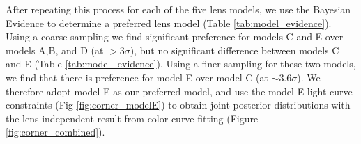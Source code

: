 \documentclass[12pt,dvipsnames]{article}
\def\SNABC{SN Requiem\xspace}
\begin{document}
After repeating this process for each of the five lens models, we use the Bayesian Evidence to determine a preferred lens model (Table \ref{tab:model_evidence}). Using a coarse sampling we find significant preference for models C and E over models A,B, and D (at $>3\sigma$), but no significant difference between models C and E (Table \ref{tab:model_evidence}). Using a finer sampling for these two models, we find that there is preference for model E over model C (at $\sim3.6\sigma$). We therefore adopt model E as our preferred model, and use the model E light curve constraints (Fig \ref{fig:corner_modelE}) to obtain joint posterior distributions with the lens-independent result from color-curve fitting (Figure \ref{fig:corner_combined}). 


\end{document}
